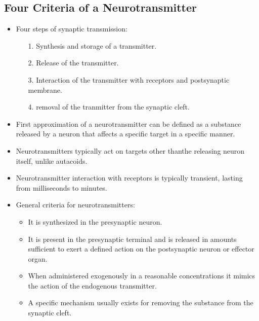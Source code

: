 \documentclass[12pt,a4paper]{article}
\begin{document}
\subsection{Four Criteria of a Neurotransmitter}   
\begin{itemize}
    \item Four steps of synaptic transmission: 
        \begin{itemize}
            \item[1.] Synthesis and storage of a transmitter.
            \item[2.] Release of the transmitter.
            \item[3.] Interaction of the transmitter with receptors and postsynaptic membrane.
            \item[4.] removal of the tranmitter from the synaptic cleft.
        \end{itemize}
    \item First approximation of a neurotransmitter can be defined as a substance released by a neuron that affects a specific target in a specific manner.
    \item Neurotransmitters typically act on targets other thanthe releasing neuron itself, unlike autacoids.
    \item Neurotransmitter interaction with receptors is typically transient, lasting from milliseconds to minutes.
    \item General criteria for neurotransmitters:
        \begin{itemize}
            \item It is synthesized in the presynaptic neuron.
            \item It is present in the presynaptic terminal and is released in amounts sufficient to exert a defined action on the postsynaptic neuron or effector organ.
            \item When administered exogenously in a reasonable concentrations it mimics the action of the endogenous transmitter.
            \item A specific mechanism usually exists for removing the substance from the synaptic cleft.
        \end{itemize}
\end{itemize}
\end{document}
